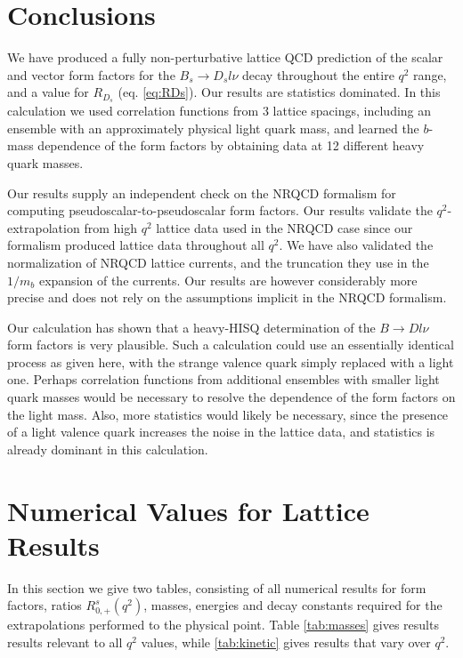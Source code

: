 \section{Conclusions}
\label{sec:BsDs_conclusions}

We have produced a fully non-perturbative lattice QCD prediction of the scalar and vector form factors for the $B_s\to D_s l\nu$ decay throughout the entire $q^2$ range, and a value for $R_{D_s}$ (eq. \eqref{eq:RDs}). Our results are statistics dominated. In this calculation we used correlation functions from 3 lattice spacings, including an ensemble with an approximately physical light quark mass, and learned the $b$-mass dependence of the form factors by obtaining data at 12 different heavy quark masses.

Our results supply an independent check on the NRQCD formalism for computing pseudoscalar-to-pseudoscalar form factors. Our results validate the $q^2$-extrapolation from high $q^2$ lattice data used in the NRQCD case since our formalism produced lattice data throughout all $q^2$. We have also validated the normalization of NRQCD lattice currents, and the truncation they use in the $1/m_b$ expansion of the currents. Our results are however considerably more precise and does not rely on the assumptions implicit in the NRQCD formalism.

Our calculation has shown that a heavy-HISQ determination of the $B\to Dl\nu$ form factors is very plausible. Such a calculation could use an essentially identical process as given here, with the strange valence quark simply replaced with a light one. Perhaps correlation functions from additional ensembles with smaller light quark masses would be necessary to resolve the dependence of the form factors on the light mass. Also, more statistics would likely be necessary, since the presence of a light valence quark increases the noise in the lattice data, and statistics is already dominant in this calculation.

\section{Numerical Values for Lattice Results}
\label{sec:tables}

In this section we give two tables, consisting of all numerical results for form factors, ratios $R_{0,+}^s(q^2)$, masses, energies and decay constants required for the extrapolations performed to the physical point. Table \ref{tab:masses} gives results results relevant to all $q^2$ values, while \ref{tab:kinetic} gives results that vary over $q^2$.

